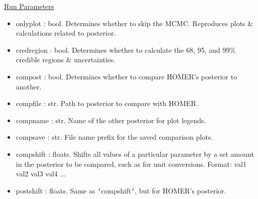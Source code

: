 \documentclass[letterpaper, 12pt]{article}
\begin{document}
\noindent \underline{Run Parameters}
\begin{itemize}
\item onlyplot    : bool. Determines whether to skip the MCMC.
                    Reproduces plots \& calculations related to posterior.
\item credregion  : bool. Determines whether to calculate the 68, 95, and 99\% 
                    credible regions \& uncertainties.
\item compost     : bool. Determines whether to compare HOMER's posterior to 
                          another.
\item compfile    : str.  Path to posterior to compare with HOMER.
\item compname    : str.  Name of the other posterior for plot legends.
\item compsave    : str.  File name prefix for the saved comparison plots.
\item compshift   : floats. Shifts all values of a particular parameter by a 
                          set amount in the posterior to be compared, such as 
                          for unit conversions.
                    Format: val1 val2 val3 val4 ...
\item postshift   : floats. Same as \texttt{`}compshift\texttt{`}, but for 
                            HOMER's posterior.
\end{itemize}
\end{document}
